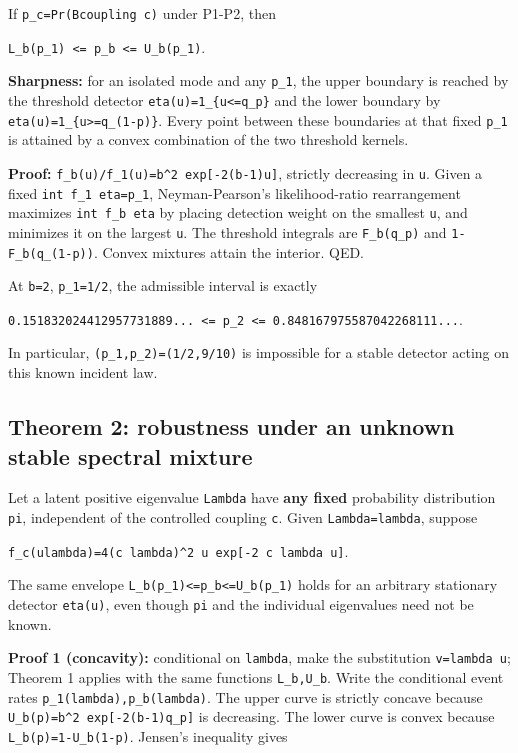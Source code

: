 \documentclass[
  10pt,
  a4paper,
]{article}
\begin{document}
If \texttt{p\_c=Pr(B\textbar{}coupling\ c)} under P1-P2, then

\texttt{L\_b(p\_1)\ \textless{}=\ p\_b\ \textless{}=\ U\_b(p\_1)}.

\textbf{Sharpness:} for an isolated mode and any \texttt{p\_1}, the upper boundary is reached by the threshold detector \texttt{eta(u)=1\_\{u\textless{}=q\_p\}} and the lower boundary by \texttt{eta(u)=1\_\{u\textgreater{}=q\_(1-p)\}}. Every point between these boundaries at that fixed \texttt{p\_1} is attained by a convex combination of the two threshold kernels.

\textbf{Proof:} \texttt{f\_b(u)/f\_1(u)=b\^{}2\ exp{[}-2(b-1)u{]}}, strictly decreasing in \texttt{u}. Given a fixed \texttt{int\ f\_1\ eta=p\_1}, Neyman-Pearson's likelihood-ratio rearrangement maximizes \texttt{int\ f\_b\ eta} by placing detection weight on the smallest \texttt{u}, and minimizes it on the largest \texttt{u}. The threshold integrals are \texttt{F\_b(q\_p)} and \texttt{1-F\_b(q\_(1-p))}. Convex mixtures attain the interior. QED.

At \texttt{b=2}, \texttt{p\_1=1/2}, the admissible interval is exactly

\texttt{0.151832024412957731889...\ \textless{}=\ p\_2\ \textless{}=\ 0.848167975587042268111...}.

In particular, \texttt{(p\_1,p\_2)=(1/2,9/10)} is impossible for a stable detector acting on this known incident law.

\subsection{Theorem 2: robustness under an unknown stable spectral mixture}\label{theorem-2-robustness-under-an-unknown-stable-spectral-mixture}

Let a latent positive eigenvalue \texttt{Lambda} have \textbf{any fixed} probability distribution \texttt{pi}, independent of the controlled coupling \texttt{c}. Given \texttt{Lambda=lambda}, suppose

\texttt{f\_c(u\textbar{}lambda)=4(c\ lambda)\^{}2\ u\ exp{[}-2\ c\ lambda\ u{]}}.

The same envelope \texttt{L\_b(p\_1)\textless{}=p\_b\textless{}=U\_b(p\_1)} holds for an arbitrary stationary detector \texttt{eta(u)}, even though \texttt{pi} and the individual eigenvalues need not be known.

\textbf{Proof 1 (concavity):} conditional on \texttt{lambda}, make the substitution \texttt{v=lambda\ u}; Theorem 1 applies with the same functions \texttt{L\_b,U\_b}. Write the conditional event rates \texttt{p\_1(lambda),p\_b(lambda)}. The upper curve is strictly concave because \texttt{U\_b\textquotesingle{}(p)=b\^{}2\ exp{[}-2(b-1)q\_p{]}} is decreasing. The lower curve is convex because \texttt{L\_b(p)=1-U\_b(1-p)}. Jensen's inequality gives
\end{document}

